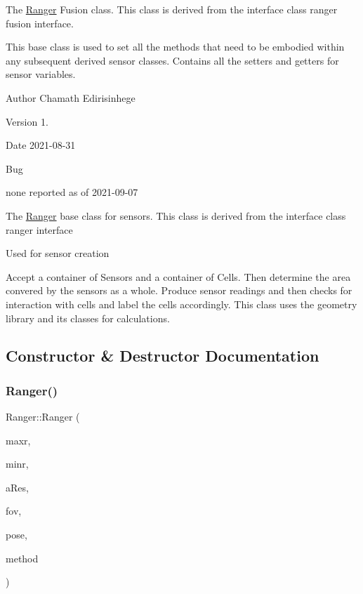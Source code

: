The \hyperlink{classRanger}{Ranger} Fusion class. This class is derived from the interface class ranger fusion interface.

This base class is used to set all the methods that need to be embodied within any subsequent derived sensor classes. Contains all the setters and getters for sensor variables. \begin{DoxyAuthor}{Author}
Chamath Edirisinhege 
\end{DoxyAuthor}
\begin{DoxyVersion}{Version}
1. 
\end{DoxyVersion}
\begin{DoxyDate}{Date}
2021-\/08-\/31 
\end{DoxyDate}
\begin{DoxyRefDesc}{Bug}
\item[\hyperlink{bug__bug000006}{Bug}]none reported as of 2021-\/09-\/07 \end{DoxyRefDesc}


The \hyperlink{classRanger}{Ranger} base class for sensors. This class is derived from the interface class ranger interface

Used for sensor creation

Accept a container of Sensors and a container of Cells. Then determine the area convered by the sensors as a whole. Produce sensor readings and then checks for interaction with cells and label the cells accordingly. This class uses the geometry library and its classes for calculations. 

\subsection{Constructor \& Destructor Documentation}
\mbox{\label{classRanger_ad87e3ddf656eae8f77c88297a313c8a1}} 
\subsubsection{\texorpdfstring{Ranger()}{Ranger()}}
{\footnotesize\ttfamily Ranger\+::\+Ranger (\begin{DoxyParamCaption}\item[{double}]{maxr,  }\item[{double}]{minr,  }\item[{unsigned int}]{a\+Res,  }\item[{unsigned int}]{fov,  }\item[{\hyperlink{structranger_1_1SensorPose}{ranger\+::\+Sensor\+Pose}}]{pose,  }\item[{\hyperlink{namespaceranger_ab04465c229cc50595ffe40a891a3b135}{ranger\+::\+Sensing\+Method}}]{method }\end{DoxyParamCaption})}



